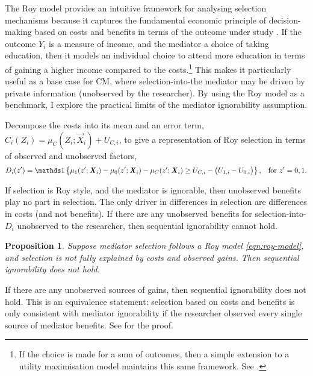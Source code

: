 The Roy model provides an intuitive framework for analysing selection mechanisms because it captures the fundamental economic principle of decision-making based on costs and benefits in terms of the outcome under study \citep{roy1951some,heckman1990empirical}.
If the outcome $Y_i$ is a measure of income, and the mediator a choice of taking education, then it models an individual choice to attend more education in terms of gaining a higher income compared to the costs.\footnote{
    If the choice is made for a sum of outcomes, then a simple extension to a utility maximisation model maintains this same framework.
    See \cite{heckman1990empirical,eisenhauer2015generalized}.
}
This makes it particularly useful as a base case for CM, where selection-into-the mediator may be driven by private information (unobserved by the researcher).
By using the Roy model as a benchmark, I explore the practical limits of the mediator ignorability assumption.

Decompose the costs into its mean and an error term, $C_i(Z_i) = \mu_{C}(Z_i; \vec X_i) + U_{C,i}$, to give a representation of Roy selection in terms of observed and unobserved factors,
\[ D_i(z') = \indicator{
    \mu_1(z'; \vec X_i) - \mu_0(z'; \vec X_i) - \mu_C(z'; \vec X_i)
    \geq U_{C,i} - \big(U_{1,i} - U_{0,i}\big) }
        , \;\;\; \text{for } z'=0,1. \]

If selection is Roy style, and the mediator is ignorable, then unobserved benefits play no part in selection.
The only driver in differences in selection are differences in costs (and not benefits).
If there are any unobserved benefits for selection-into-$D_i$ unobserved to the researcher, then sequential ignorability cannot hold.
\newtheorem{proposition}{Proposition}
\begin{proposition}
    \label{prop:roy-seq-ig}
    Suppose mediator selection follows a Roy model \eqref{eqn:roy-model}, and selection is not fully explained by costs and observed gains.
    Then sequential ignorability does not hold.
\end{proposition}
If there are any unobserved sources of gains, then sequential ignorability does not hold.
This is an equivalence statement: selection based on costs and benefits is only consistent with mediator ignorability if the researcher observed every single source of mediator benefits.
See  for the proof.


